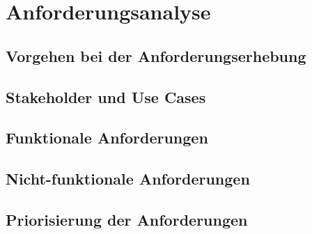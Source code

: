\section{Anforderungsanalyse}

\subsection{Vorgehen bei der Anforderungserhebung}

\subsection{Stakeholder und Use Cases}

\subsection{Funktionale Anforderungen}

\subsection{Nicht-funktionale Anforderungen}

\subsection{Priorisierung der Anforderungen}
